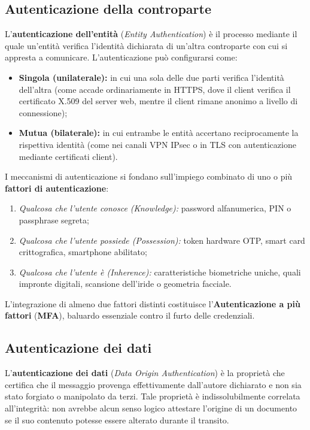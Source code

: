 \documentclass[../../main.tex]{subfiles}
\begin{document}
\subsection{Autenticazione della controparte}
\label{subsec:autenticazione_controparte}

L'\textbf{autenticazione dell'entità} (\textit{Entity Authentication}) è il processo mediante il quale un'entità verifica l'identità dichiarata di un'altra controparte con cui si appresta a comunicare. L'autenticazione può configurarsi come:
\begin{itemize}
    \item \textbf{Singola (unilaterale):} in cui una sola delle due parti verifica l'identità dell'altra (come accade ordinariamente in HTTPS, dove il client verifica il certificato X.509 del server web, mentre il client rimane anonimo a livello di connessione);
    \item \textbf{Mutua (bilaterale):} in cui entrambe le entità accertano reciprocamente la rispettiva identità (come nei canali VPN IPsec o in TLS con autenticazione mediante certificati client).
\end{itemize}

I meccanismi di autenticazione si fondano sull'impiego combinato di uno o più \textbf{fattori di autenticazione}:
\begin{enumerate}
    \item \textit{Qualcosa che l'utente conosce (Knowledge):} password alfanumerica, PIN o passphrase segreta;
    \item \textit{Qualcosa che l'utente possiede (Possession):} token hardware OTP, smart card crittografica, smartphone abilitato;
    \item \textit{Qualcosa che l'utente è (Inherence):} caratteristiche biometriche uniche, quali impronte digitali, scansione dell'iride o geometria facciale.
\end{enumerate}
L'integrazione di almeno due fattori distinti costituisce l'\textbf{Autenticazione a più fattori} (\textbf{MFA}), baluardo essenziale contro il furto delle credenziali.

\subsection{Autenticazione dei dati}
\label{subsec:autenticazione_dati}

L'\textbf{autenticazione dei dati} (\textit{Data Origin Authentication}) è la proprietà che certifica che il messaggio provenga effettivamente dall'autore dichiarato e non sia stato forgiato o manipolato da terzi. Tale proprietà è indissolubilmente correlata all'integrità: non avrebbe alcun senso logico attestare l'origine di un documento se il suo contenuto potesse essere alterato durante il transito.
\end{document}

